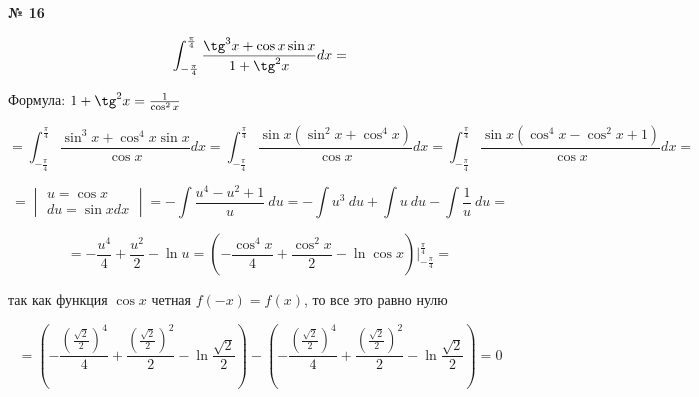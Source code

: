 \documentclass{article}
\begin{document}
\textbf{№ 16} 

$$ \int_{-\frac{\pi}{4}}^{\frac{\pi}{4}} \frac{\tg^3{x}+\cos{x}\sin{x}}{1+\tg^2{x}}dx 
= $$

Формула: $ 1+\tg^2{x} = \frac{1}{\cos^2{x}}$

$$ = \int_{-\frac{\pi}{4}}^{\frac{\pi}{4}} \frac{\sin^3{x}+\cos^4{x}\sin{x}}{\cos{x}}dx
= \int_{-\frac{\pi}{4}}^{\frac{\pi}{4}} \frac{\sin{x}(\sin^2{x} + \cos^4{x})}{\cos{x}}dx 
= \int_{-\frac{\pi}{4}}^{\frac{\pi}{4}} \frac{\sin{x}(\cos^4{x} - \cos^2{x} + 1)}{\cos{x}}dx
= $$


$$ = \begin{vmatrix}    u  = \cos{x} \\ 
                        du = \sin{x} dx \end{vmatrix}
=  -\int \frac{u^4-u^2+1}{u} \ du
= -\int u^3 \ du + \int u \ du - \int \frac{1}{u} \ du
= $$

$$ = -\frac{u^4}{4} + \frac{u^2}{2} - \ln{u}
= \left( -\frac{\cos^4{x}}{4} + \frac{\cos^2{x}}{2} - \ln{\cos{x}} \right) \bigg\vert_{-\frac{\pi}{4}}^{\frac{\pi}{4}}
= $$

так как функция $\cos{x}$ четная $f(-x) = f(x)$, то все это равно нулю

$$ = \left( -\frac{(\frac{\sqrt{2}}{2})^4}{4} + \frac{(\frac{\sqrt{2}}{2})^2}{2} - \ln{\frac{\sqrt{2}}{2}} \right) - \left( -\frac{(\frac{\sqrt{2}}{2})^4}{4} + \frac{(\frac{\sqrt{2}}{2})^2}{2} - \ln{\frac{\sqrt{2}}{2}} \right)
= 0$$
\end{document}
